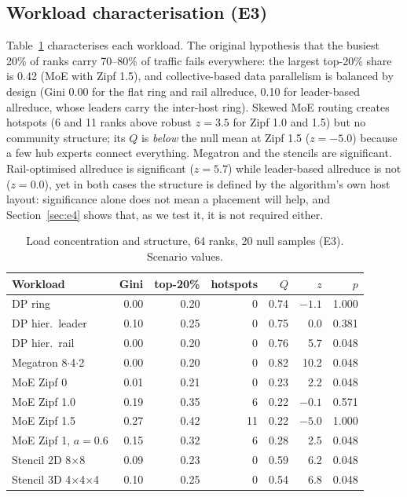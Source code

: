 \documentclass[conference]{IEEEtran}
\begin{document}
\subsection{Workload characterisation (E3)}
Table~\ref{tab:e3} characterises each workload. The original hypothesis that the busiest 20\% of
ranks carry 70--80\% of traffic fails everywhere: the largest top-20\% share is 0.42 (MoE with Zipf
1.5), and collective-based data parallelism is balanced by design (Gini 0.00 for the flat ring and
rail allreduce, 0.10 for leader-based allreduce, whose leaders carry the inter-host ring). Skewed MoE routing
creates hotspots (6 and 11 ranks above robust $z=3.5$ for Zipf 1.0 and 1.5) but no community
structure; its $Q$ is \emph{below} the null mean at Zipf 1.5 ($z=-5.0$) because a few hub experts
connect everything. Megatron and the stencils are significant. Rail-optimised allreduce is
significant ($z=5.7$) while leader-based allreduce is not ($z=0.0$), yet in both cases the
structure is defined by the algorithm's own host layout: significance alone does not mean a placement
will help, and Section~\ref{sec:e4} shows that, as we test it, it is not required either.

\begin{table}[t]
\caption{Load concentration and structure, 64 ranks, 20 null samples (E3). Scenario values.}\label{tab:e3}
\centering\footnotesize
\begin{tabular}{@{}lrrrrrr@{}}
\toprule
Workload & Gini & top-20\% & hotspots & $Q$ & $z$ & $p$ \\
\midrule
DP ring              & 0.00 & 0.20 & 0  & 0.74 & $-1.1$ & 1.000 \\
DP hier.\ leader     & 0.10 & 0.25 & 0  & 0.75 & 0.0 & 0.381 \\
DP hier.\ rail       & 0.00 & 0.20 & 0  & 0.76 & 5.7 & 0.048 \\
Megatron 8$\cdot$4$\cdot$2 & 0.00 & 0.20 & 0 & 0.82 & 10.2 & 0.048 \\
MoE Zipf 0           & 0.01 & 0.21 & 0  & 0.23 & 2.2 & 0.048 \\
MoE Zipf 1.0         & 0.19 & 0.35 & 6  & 0.22 & $-0.1$ & 0.571 \\
MoE Zipf 1.5         & 0.27 & 0.42 & 11 & 0.22 & $-5.0$ & 1.000 \\
MoE Zipf 1, $a{=}0.6$ & 0.15 & 0.32 & 6 & 0.28 & 2.5 & 0.048 \\
Stencil 2D 8$\times$8 & 0.09 & 0.23 & 0 & 0.59 & 6.2 & 0.048 \\
Stencil 3D 4$\times$4$\times$4 & 0.10 & 0.25 & 0 & 0.54 & 6.8 & 0.048 \\
\bottomrule
\end{tabular}
\end{table}
\end{document}
